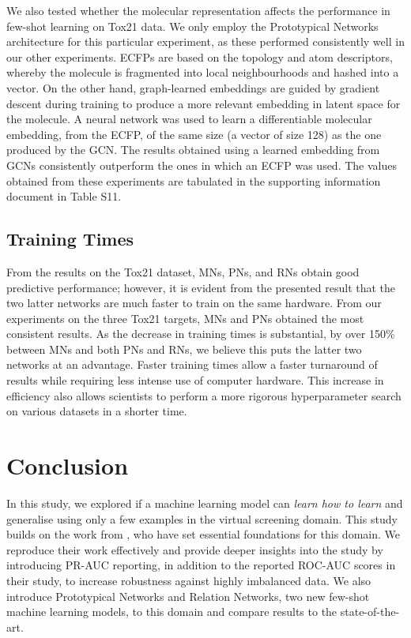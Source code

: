 \documentclass[journal=jcisd8,manuscript=article]{achemso} %
\begin{document}
We also tested whether the molecular representation affects the performance in few-shot learning on Tox21 data. We only employ the Prototypical Networks architecture for this particular experiment, as these performed consistently well in our other experiments. ECFPs are based on the topology and atom descriptors, whereby the molecule is fragmented into local neighbourhoods and hashed into a vector. On the other hand, graph-learned embeddings are guided by gradient descent during training to produce a more relevant embedding in latent space for the molecule. A neural network was used to learn a differentiable molecular embedding, from the ECFP, of the same size (a vector of size 128) as the one produced by the GCN. The results obtained using a learned embedding from GCNs consistently outperform the ones in which an ECFP was used. The values obtained from these experiments are tabulated in the supporting information document in Table S11.

\subsection{Training Times}

From the results on the Tox21 dataset, MNs, PNs, and RNs obtain good predictive performance; however, it is evident from the presented result that the two latter networks are much faster to train on the same hardware. From our experiments on the three Tox21 targets, MNs and PNs obtained the most consistent results. As the decrease in training times is substantial, by over 150\% between MNs and both PNs and RNs, we believe this puts the latter two networks at an advantage. Faster training times allow a faster turnaround of results while requiring less intense use of computer hardware. This increase in efficiency also allows scientists to perform a more rigorous hyperparameter search on various datasets in a shorter time.

\section{Conclusion}

In this study, we explored if a machine learning model can \textit{learn how to learn} and generalise using only a few examples in the virtual screening domain. This study builds on the work from \citet{altae2017low}, who have set essential foundations for this domain. We reproduce their work effectively and provide deeper insights into the study by introducing PR-AUC reporting, in addition to the reported ROC-AUC scores in their study, to increase robustness against highly imbalanced data. We also introduce Prototypical Networks and Relation Networks, two new few-shot machine learning models, to this domain and compare results to the state-of-the-art.
\end{document}
